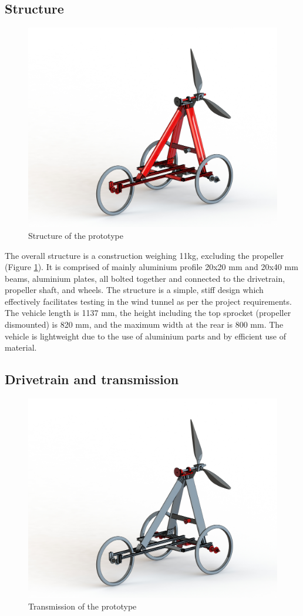 \subsection{Structure}

\begin{figure}[H]
    \centering
    \includegraphics[width = 0.5\linewidth]{images/renders/structure.JPG}
    \caption{Structure of the prototype}
    \label{fig:structrender}
\end{figure}

The overall structure is a construction weighing 11kg, excluding the propeller (Figure \ref{fig:structrender}). It is comprised of mainly aluminium profile 20x20 mm and 20x40 mm beams, aluminium plates, all bolted together and connected to the drivetrain, propeller shaft, and wheels. The structure is a simple, stiff design which effectively facilitates testing in the wind tunnel as per the project requirements. The vehicle length is 1137 mm, the height including the top sprocket (propeller dismounted) is 820 mm, and the maximum width at the rear is 800 mm. The vehicle is lightweight due to the use of aluminium parts and by efficient use of material.


\subsection{Drivetrain and transmission}

\begin{figure}[H]
    \centering
    \includegraphics[width = 0.5\linewidth]{images/renders/drivetrain.JPG}
    \caption{Transmission of the prototype}
    \label{fig:transmirender}
\end{figure}

